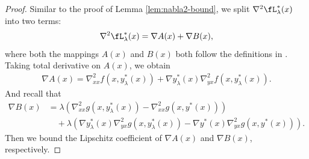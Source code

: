 \begin{proof}
Similar to the proof of Lemma \ref{lem:nabla2-bound},  we split $\nabla^2 \fL_{\lambda}^*(x)$ into two terms:
\begin{align*}
    \nabla^2 \fL_{\lambda}^*(x) = \nabla A(x) + \nabla B(x),
\end{align*}
where both the mappings $A(x)$ and $B(x)$ both follow the definitions in . 
Taking total derivative on $A(x)$, we obtain
\begin{align*}
    \nabla A(x) = \nabla_{xx}^2 f(x,y_{\lambda}^*(x)) + \nabla y_{\lambda}^*(x) \nabla_{yx}^2 f(x,y_{\lambda}^*(x)).
\end{align*}
And recall  that 
\begin{align*}
    \nabla B(x) &= \lambda (\nabla_{xx}^2 g(x,y_{\lambda}^*(x))-\nabla_{xx}^2 g(x,y^*(x))) \\
    &\quad + \lambda \left(\nabla y_{\lambda}^*(x)  \nabla_{yx}^2 g(x,y_{\lambda}^*(x)) - \nabla y^*(x) \nabla_{yx}^2 g(x,y^*(x)) \right).
\end{align*}
Then we bound the Lipschitz coefficient of $\nabla A(x)$ and $\nabla B(x)$, respectively.


\end{proof}
